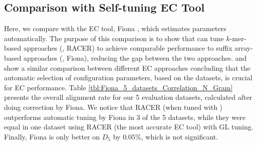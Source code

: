 \vspace{-12pt}
\subsection{Comparison with Self-tuning EC Tool}
\vspace{-5pt}
Here, we compare \name with the EC tool, Fiona \cite{schulz2014fiona}, which estimates parameters automatically. The purpose of this comparison is to show that \name can tune $k$-mer-based approaches (\eg, RACER) to achieve comparable performance to suffix array-based approaches (\eg, Fiona), reducing the gap between the two approaches. \cite{yang2012survey} and \cite{molnar2014correcting} show a similar comparison between different EC approaches concluding that the automatic selection of configuration parameters, based on the datasets, is crucial for EC performance.
 Table \ref{tbl:Fiona_5_datasets_Correlation_N_Gram} presents the overall alignment rate for our 5 evaluation datasets, calculated after doing correction by Fiona. We notice that RACER (when tuned with \name) outperforms automatic tuning by Fiona in 3 of the 5 datasets, while they were equal in one dataset using RACER (the most accurate EC tool) with GL tuning. Finally, Fiona is only better on $D_{5} $ by $0.05\%$, which is not significant.  






